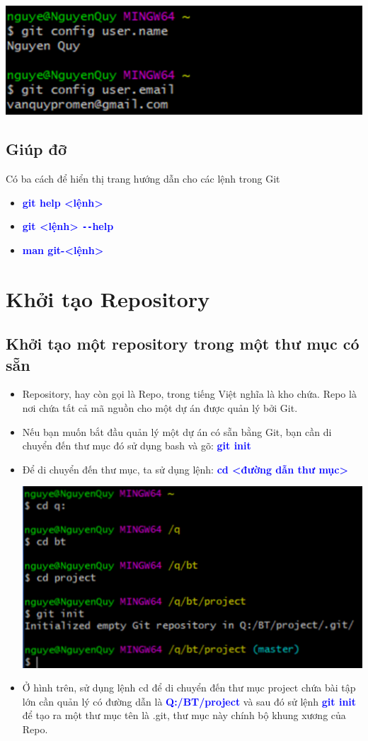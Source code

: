 \documentclass[12pt,a4paper]{report}
\begin{document}
	\includegraphics[width=0.8\linewidth]{screenshot004}
	\label{fig:screenshot004}
 \vskip 0.4cm\vskip 0.4cm
\subsection{Giúp đỡ} 
 Có ba cách để hiển thị trang hướng dẫn cho các lệnh trong Git
\begin{itemize}
\item \textcolor{blue}{\bf git help <lệnh>}
\item \textcolor{blue}{\bf git <lệnh> \texttt{-{}-}help}
\item \textcolor{blue}{\bf man git-<lệnh>}
\end{itemize}
 
\section{Khởi tạo Repository}

\subsection{Khởi tạo một repository trong một thư mục có sẵn}
\begin{itemize}
\item Repository, hay còn gọi là Repo, trong tiếng Việt nghĩa là kho chứa. Repo là nơi chứa tất cả mã nguồn cho một dự án được quản lý bởi Git.
\item Nếu bạn muốn bắt đầu quản lý một dự án có sẵn bằng Git, bạn cần di chuyển đến thư mục đó sử dụng bash và gõ: \textcolor{blue}{\bf git init}
\item Để di chuyển đến thư mục, ta sử dụng lệnh: \textcolor{blue}{\bf cd <đường dẫn thư mục> }

	\includegraphics[width=0.8\linewidth]{screenshot005}

	\label{fig:screenshot005}

\item Ở hình trên, sử dụng lệnh cd để di chuyển đến thư mục project chứa bài tập lớn cần quản lý có đường dẫn là \textcolor{blue}{\bf Q:/BT/project} và sau đó sử lệnh \textcolor{blue}{\bf git init} để tạo ra một thư mục tên là .git, thư mục này chính bộ khung xương của Repo.
\end{itemize}
\end{document}

